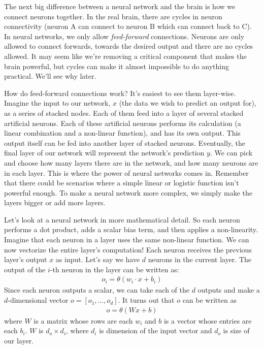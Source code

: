 \documentclass[a4paper,10pt]{article}
\begin{document}

The next big difference between
a neural network and the brain
is how we connect neurons together.
In the real brain,
there are cycles in neuron connectivity
(neuron A can connect to neuron B which
can connect back to C). In
neural networks, we only allow
\emph{feed-forward} connections.
Neurons are only allowed to connect
forwards, towards the desired output
and there are no cycles allowed.
It may seem like we're removing
a critical component that makes the brain powerful,
but cycles can make it almost impossible
to do anything practical. We'll see why later.

How do feed-forward connections work?
It's easiest to see them layer-wise.
Imagine the input to our network, $x$ (the data
we wish to predict an output for),
as a series of stacked nodes.
Each of them feed into a layer of several stacked artificial neurons.
Each of these artificial neurons performs its calculation (a linear combination
and a non-linear function), and has its own output.
This output itself can be fed into another layer of
stacked neurons. Eventually, the final layer of our network
will represent the network's prediction $y$.
We can pick and choose how many layers
there are in the network, and how many neurons
are in each layer. This is where
the power of neural networks comes in. Remember
that there could be scenarios where
a simple linear or logistic function isn't
powerful enough. To make a neural network
more complex, we simply make the layers
bigger or add more layers.

Let's look at a neural network
in more mathematical detail.
So each neuron
performs a dot product, adds a scalar bias
term, and then applies a non-linearity.
Imagine that each neuron in a layer
uses the same non-linear function.
We can now vectorize
the entire layer's computation!
Each neuron receives the previous layer's output $x$
as input.
Let's say we have $d$ neurons in the current layer.
The output of the $i$-th neuron
in the layer can be written as:
\begin{align*}
  o_i = \theta(w_i \cdot x + b_i)
\end{align*}
Since each neuron outputs a scalar,
we can take each of the $d$ outputs
and make a $d$-dimensional vector
$o = [o_1, \ldots, o_d]$.
It turns out that $o$ can be written as
\begin{align*}
  o = \theta(Wx + b)
\end{align*}
where $W$ is a matrix
whose rows are each $w_i$
and $b$ is a vector
whose entries are each $b_i$.
$W$ is $d_o \times d_i$,
where $d_i$ is dimension
of the input vector
and $d_o$ is size of our layer.
\end{document}
